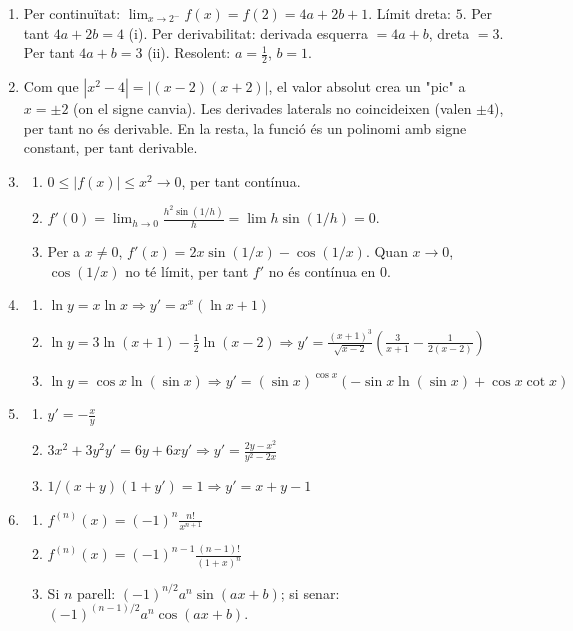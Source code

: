 \documentclass[12pt]{article}
\begin{document}
\begin{enumerate}[label=\arabic*.]
    \item Per continuïtat: $\lim_{x\to 2^-} f(x)=f(2)=4a+2b+1$. Límit dreta: $5$. Per tant $4a+2b=4$ (i).
    Per derivabilitat: derivada esquerra $=4a+b$, dreta $=3$. Per tant $4a+b=3$ (ii).
    Resolent: $a= \frac{1}{2}$, $b=1$.

    \item Com que $|x^2-4| = |(x-2)(x+2)|$, el valor absolut crea un "pic" a $x=\pm2$ (on el signe canvia). Les derivades laterals no coincideixen (valen $\pm 4$), per tant no és derivable. En la resta, la funció és un polinomi amb signe constant, per tant derivable.

    \item 
    \begin{enumerate}[label=\alph*)]
        \item $0 \le |f(x)| \le x^2 \to 0$, per tant contínua.
        \item $f'(0)=\lim_{h\to0} \frac{h^2\sin(1/h)}{h} = \lim h\sin(1/h)=0$.
        \item Per a $x\neq0$, $f'(x)=2x\sin(1/x)-\cos(1/x)$. Quan $x\to0$, $\cos(1/x)$ no té límit, per tant $f'$ no és contínua en $0$.
    \end{enumerate}

    \item 
    \begin{enumerate}[label=\alph*)]
        \item $\ln y = x\ln x \Rightarrow y' = x^x(\ln x+1)$
        \item $\ln y = 3\ln(x+1) - \frac{1}{2}\ln(x-2) \Rightarrow y' = \frac{(x+1)^3}{\sqrt{x-2}}\left(\frac{3}{x+1} - \frac{1}{2(x-2)}\right)$
        \item $\ln y = \cos x \ln(\sin x) \Rightarrow y' = (\sin x)^{\cos x}(-\sin x\ln(\sin x)+\cos x\cot x)$
    \end{enumerate}

    \item 
    \begin{enumerate}[label=\alph*)]
        \item $y' = -\frac{x}{y}$
        \item $3x^2+3y^2y'=6y+6xy' \Rightarrow y'=\frac{2y-x^2}{y^2-2x}$
        \item $1/(x+y)(1+y')=1 \Rightarrow y'=x+y-1$
    \end{enumerate}

    \item 
    \begin{enumerate}[label=\alph*)]
        \item $f^{(n)}(x)=(-1)^n \frac{n!}{x^{n+1}}$
        \item $f^{(n)}(x)=(-1)^{n-1}\frac{(n-1)!}{(1+x)^n}$
        \item Si $n$ parell: $(-1)^{n/2}a^n\sin(ax+b)$; si senar: $(-1)^{(n-1)/2}a^n\cos(ax+b)$.
    \end{enumerate}


\end{enumerate}
\end{document}
